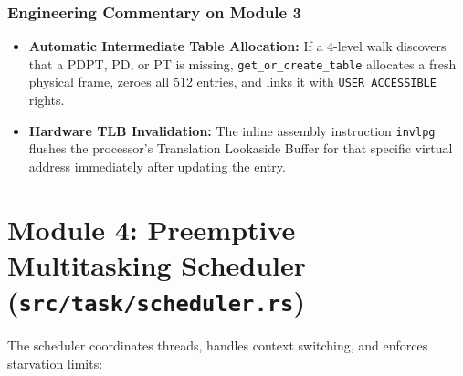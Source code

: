 \subsubsection*{Engineering Commentary on Module 3}
\begin{itemize}
    \item \textbf{Automatic Intermediate Table Allocation:} If a 4-level walk discovers that a PDPT, PD, or PT is missing, \texttt{get\_or\_create\_table} allocates a fresh physical frame, zeroes all 512 entries, and links it with \texttt{USER\_ACCESSIBLE} rights.
    \item \textbf{Hardware TLB Invalidation:} The inline assembly instruction \texttt{invlpg} flushes the processor's Translation Lookaside Buffer for that specific virtual address immediately after updating the entry.
\end{itemize}

\section{Module 4: Preemptive Multitasking Scheduler (\texttt{src/task/scheduler.rs})}
\label{sec:tour_scheduler_annotated}

The scheduler coordinates threads, handles context switching, and enforces starvation limits:

